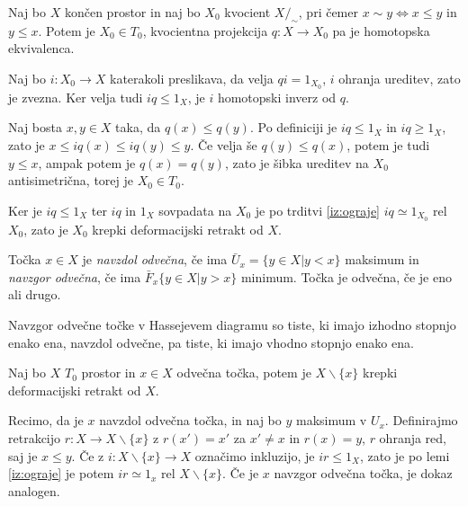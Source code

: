 \documentclass[mat1]{fmfdelo}
\begin{document}
\begin{trditev}
    Naj bo $X$ končen prostor in naj bo $X_0$ kvocient $X/_\sim$, pri čemer $x\sim y \Leftrightarrow x\le y$ in $y\le x$. Potem je $X_0\in T_0$, kvocientna projekcija $q:X\rightarrow X_0$ pa je homotopska ekvivalenca.
\end{trditev}

\begin{dokaz}
    Naj bo $i:X_0\rightarrow X$ katerakoli preslikava, da velja $qi=1_{X_0}$, $i$ ohranja ureditev, zato je zvezna. Ker velja tudi $iq \leq 1_X$, je $i$ homotopski inverz od $q$.

    Naj bosta $x,y\in X$ taka, da $q(x)\leq q(y)$. Po definiciji je $iq \leq 1_X$ in $iq \geq 1_X$, zato je $x \leq iq(x) \leq iq(y) \leq y$. Če velja še $q(y)\leq q(x)$, potem je tudi $y\leq x$, ampak potem je $q(x)=q(y)$, zato je šibka ureditev na $X_0$ antisimetrična, torej je $X_0\in T_0$.
\end{dokaz}


    Ker je $iq\leq 1_X$ ter $iq$ in $1_X$ sovpadata na $X_0$ je po trditvi \ref{iz:ograje} 
    $iq \simeq 1_{X_0}$ rel $X_0$, zato je $X_0$ krepki deformacijski retrakt od $X$.

\begin{definicija}
    Točka $x \in X$ je \textit{navzdol odvečna}, če ima $\bar{U}_x=\{y\in X | y < x\}$ maksimum in \textit{navzgor odvečna}, če ima $\bar{F}_x\{y\in X | y > x\}$ minimum. 
    Točka je odvečna, če je eno ali drugo.
\end{definicija}

Navzgor odvečne točke v Hassejevem diagramu so tiste, ki imajo 
izhodno stopnjo enako ena, navzdol odvečne, pa tiste, ki imajo vhodno stopnjo enako ena.
\begin{trditev}
Naj bo $X$ $T_0$ prostor in $x\in X$ odvečna točka, potem je $X\backslash \{x\}$ krepki deformacijski retrakt od $X$.
\end{trditev}

\begin{dokaz}
Recimo, da je $x$ navzdol odvečna točka, in naj bo $y$ 
maksimum v $U_x$. Definirajmo retrakcijo $r:X\rightarrow 
X\backslash \{x\}$ z $r(x')=x'$ za $x'\neq x$ in $r(x)=y$, 
$r$ ohranja red, saj je $x\leq y$. Če z $i:X\backslash\{x\} 
\rightarrow X$ označimo inkluzijo, je $ir\leq 1_X$, zato je 
po lemi \ref{iz:ograje} je potem $ir \simeq 1_x$ rel 
$X\backslash\{x\}$. Če je $x$ navzgor odvečna točka, je 
dokaz analogen.
\end{dokaz}
\end{document}
